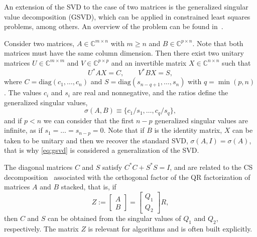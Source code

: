 An extension of the SVD to the case of two matrices is the generalized singular value decomposition (GSVD), which can be applied in constrained least squares problems, among others. An overview of the problem can be found in~\citep[\S 8.7.3]{Golub:1996:MC}.

Consider two matrices, $A\in\mathbb{C}^{m\times n}$ with $m\geq n$ and $B\in\mathbb{C}^{p\times n}$. Note that both matrices must have the same column dimension. Then there exist two unitary matrices $U\in\mathbb{C}^{m\times m}$ and $V\in\mathbb{C}^{p\times p}$ and an invertible matrix $X\in\mathbb{C}^{n\times n}$ such that
\begin{equation}
\label{eq:gsvd}
U^*AX=C,\qquad V^*BX=S,
\end{equation}
where $C=\mathrm{diag}(c_1,\dots,c_n)$ and $S=\mathrm{diag}(s_{n-q+1},\dots,s_n)$ with $q=\min(p,n)$. The values $c_i$ and $s_i$ are real and nonnegative, and the ratios define the generalized singular values,
\begin{equation}
\label{eq:gsvd-values}
\sigma(A,B)\equiv\{c_1/s_1,\dots,c_q/s_q\},
\end{equation}
and if $p<n$ we can consider that the first $n-p$ generalized singular values are infinite, as if $s_1=\dots=s_{n-p}=0$. Note that if $B$ is the identity matrix, $X$ can be taken to be unitary and then we recover the standard SVD, $\sigma(A,I)=\sigma(A)$, that is why \eqref{eq:gsvd} is considered a generalization of the SVD.

The diagonal matrices $C$ and $S$ satisfy $C^*C+S^*S=I$, and are related to the CS decomposition~\citep[\S 2.6.4]{Golub:1996:MC} associated with the orthogonal factor of the QR factorization of matrices $A$ and $B$ stacked, that is, if
\begin{equation}
\label{eq:qr}
Z:=\begin{bmatrix}A\\B\end{bmatrix}=\begin{bmatrix}Q_1\\Q_2\end{bmatrix}R,
\end{equation}
then $C$ and $S$ can be obtained from the singular values of $Q_1$ and $Q_2$, respectively. The matrix $Z$ is relevant for algorithms and is often built explicitly.

